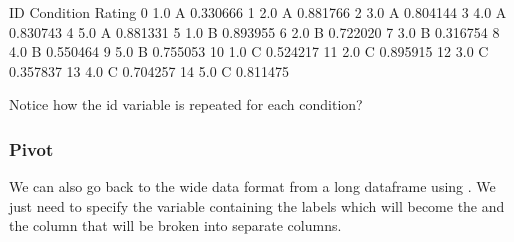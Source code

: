 \documentclass[letterpaper,10pt,english]{sphinxmanual}
\begin{document}
\begin{sphinxVerbatim}[commandchars=\\\{\}]
   \PYG{p}{[}  \PYG{p}{]}  
\end{sphinxVerbatim}

\begin{sphinxVerbatim}[commandchars=\\\{\}]
     ID Condition    Rating
0   1.0         A  0.330666
1   2.0         A  0.881766
2   3.0         A  0.804144
3   4.0         A  0.830743
4   5.0         A  0.881331
5   1.0         B  0.893955
6   2.0         B  0.722020
7   3.0         B  0.316754
8   4.0         B  0.550464
9   5.0         B  0.755053
10  1.0         C  0.524217
11  2.0         C  0.895915
12  3.0         C  0.357837
13  4.0         C  0.704257
14  5.0         C  0.811475
\end{sphinxVerbatim}

Notice how the id variable is repeated for each condition?


\subsubsection{Pivot}
\label{\detokenize{content/Introduction_to_Pandas:pivot}}
We can also go back to the wide data format from a long dataframe using . We just need to specify the variable containing the labels which will become the  and the  column that will be broken into separate columns.

\begin{sphinxVerbatim}[commandchars=\\\{\}]
    
\end{sphinxVerbatim}
\end{document}
